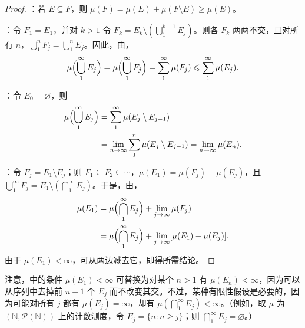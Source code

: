 \documentclass[../../main.tex]{subfiles}%
\begin{document}
\begin{proof}
：若 $E\subseteq F$，则 $\mu(F)=\mu(E)+\mu(F\setminus E)\geqslant\mu(E)$。

：令 $F_1=E_1$，并对 $k>1$ 令 $F_k=E_k\setminus(\bigcup_1^{k-1}E_j)$。则各 $F_k$ 两两不交，且对所有 $n$，$\bigcup_1^nF_j=\bigcup_1^nE_j$。因此，由，
\begin{align*}
\mu\Bigl(\bigcup_1^\infty E_j\Bigr)
=\mu\Bigl(\bigcup_1^\infty F_j\Bigr)
=\sum_1^\infty\mu(F_j)\leqslant\sum_1^\infty\mu(E_j).
\end{align*}

：令 $E_0=\varnothing$，则
\begin{align*}
\mu\Bigl(\bigcup_1^\infty E_j\Bigr)
&=\sum_1^\infty\mu(E_j\setminus E_{j-1})\\
&=\lim_{n\to\infty}\sum_1^n\mu(E_j\setminus E_{j-1})=\lim_{n\to\infty}\mu(E_n).
\end{align*}

：令 $F_j=E_1\setminus E_j$；则 $F_1\subseteq F_2\subseteq\cdots$，$\mu(E_1)=\mu(F_j)+\mu(E_j)$，且 $\bigcup_1^\infty F_j=E_1\setminus(\bigcap_1^\infty E_j)$。于是，由，
\begin{align*}
\mu(E_1)&=\mu\Bigl(\bigcap_1^\infty E_j\Bigr)+\lim_{j\to\infty}\mu(F_j)\\
&=\mu\Bigl(\bigcap_1^\infty E_j\Bigr)+\lim_{j\to\infty}[\mu(E_1)-\mu(E_j)].
\end{align*}
由于 $\mu(E_1)<\infty$，可从两边减去它，即得所需结论。
\end{proof}


\begin{remark}
注意，中的条件 $\mu(E_1)<\infty$ 可替换为对某个 $n>1$ 有 $\mu(E_n)<\infty$，因为可以从序列中去掉前 $n-1$ 个 $E_j$ 而不改变其交。不过，某种有限性假设是必要的，因为可能对所有 $j$ 都有 $\mu(E_j)=\infty$，却有 $\mu(\bigcap_1^\infty E_j)<\infty$。（例如，取 $\mu$ 为 $(\mathbb{N},\mathscr{P}(\mathbb{N}))$ 上的计数测度，令 $E_j=\{n:n\geqslant j\}$；则 $\bigcap_1^\infty E_j=\varnothing$。）
\end{remark}
\end{document}
